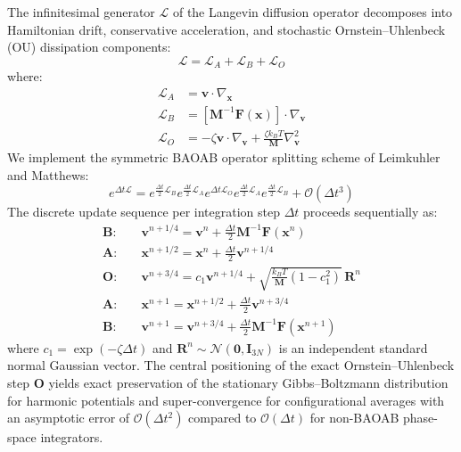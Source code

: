 \documentclass[journal=jpcbfk,manuscript=article]{achemso}
\begin{document}
The infinitesimal generator $\mathcal{L}$ of the Langevin diffusion operator decomposes into Hamiltonian drift, conservative acceleration, and stochastic Ornstein--Uhlenbeck (OU) dissipation components:
\begin{equation}
\mathcal{L} = \mathcal{L}_A + \mathcal{L}_B + \mathcal{L}_O
\end{equation}
where:
\begin{align}
\mathcal{L}_A &= \mathbf{v} \cdot \nabla_{\mathbf{x}} \\
\mathcal{L}_B &= \left[ \mathbf{M}^{-1} \mathbf{F}(\mathbf{x}) \right] \cdot \nabla_{\mathbf{v}} \\
\mathcal{L}_O &= - \zeta \mathbf{v} \cdot \nabla_{\mathbf{v}} + \frac{\zeta k_B T}{\mathbf{M}} \nabla_{\mathbf{v}}^2
\end{align}
We implement the symmetric BAOAB operator splitting scheme of Leimkuhler and Matthews:\cite{leimkuhler2013rational}
\begin{equation}
e^{\Delta t \mathcal{L}} = e^{\frac{\Delta t}{2} \mathcal{L}_B} e^{\frac{\Delta t}{2} \mathcal{L}_A} e^{\Delta t \mathcal{L}_O} e^{\frac{\Delta t}{2} \mathcal{L}_A} e^{\frac{\Delta t}{2} \mathcal{L}_B} + \mathcal{O}(\Delta t^3)
\end{equation}
The discrete update sequence per integration step $\Delta t$ proceeds sequentially as:
\begin{align}
\mathbf{B}: \quad &\mathbf{v}^{n + 1/4} = \mathbf{v}^n + \frac{\Delta t}{2} \mathbf{M}^{-1} \mathbf{F}(\mathbf{x}^n) \\
\mathbf{A}: \quad &\mathbf{x}^{n + 1/2} = \mathbf{x}^n + \frac{\Delta t}{2} \mathbf{v}^{n + 1/4} \\
\mathbf{O}: \quad &\mathbf{v}^{n + 3/4} = c_1 \mathbf{v}^{n + 1/4} + \sqrt{\frac{k_B T}{\mathbf{M}}(1 - c_1^2)} \, \mathbf{R}^n \\
\mathbf{A}: \quad &\mathbf{x}^{n + 1} = \mathbf{x}^{n + 1/2} + \frac{\Delta t}{2} \mathbf{v}^{n + 3/4} \\
\mathbf{B}: \quad &\mathbf{v}^{n + 1} = \mathbf{v}^{n + 3/4} + \frac{\Delta t}{2} \mathbf{M}^{-1} \mathbf{F}(\mathbf{x}^{n + 1})
\end{align}
where $c_1 = \exp(-\zeta \Delta t)$ and $\mathbf{R}^n \sim \mathcal{N}(\mathbf{0}, \mathbf{I}_{3N})$ is an independent standard normal Gaussian vector. The central positioning of the exact Ornstein--Uhlenbeck step $\mathbf{O}$ yields exact preservation of the stationary Gibbs--Boltzmann distribution for harmonic potentials and super-convergence for configurational averages with an asymptotic error of $\mathcal{O}(\Delta t^2)$ compared to $\mathcal{O}(\Delta t)$ for non-BAOAB phase-space integrators.
\end{document}
